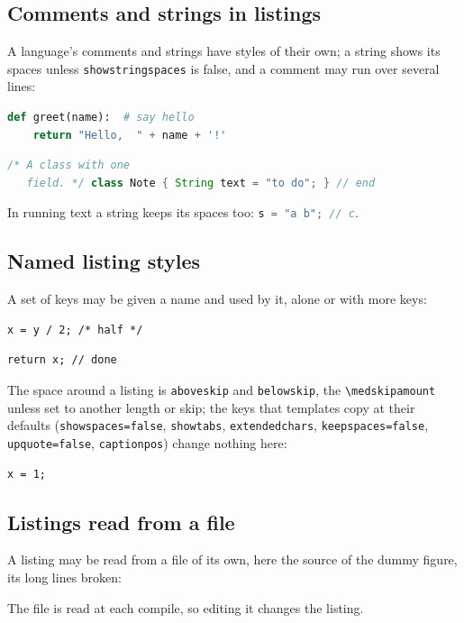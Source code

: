 \documentclass{article}
\numberwithin{equation}{section}
\theoremstyle{definition}
\theoremstyle{remark}
\begin{document}
\subsection{Comments and strings in listings}\label{sec:lstcomments}
A language's comments and strings have styles of their own; a string shows its spaces
unless \texttt{showstringspaces} is false, and a comment may run over several lines:
\begin{lstlisting}[language=Python,commentstyle=\color{rtdeep}\itshape,stringstyle=\color{rtblue}]
def greet(name):  # say hello
    return "Hello,  " + name + '!'
\end{lstlisting}
\begin{lstlisting}[language=Java,columns=fullflexible,showstringspaces=false,stringstyle=\color{rtblue}]
/* A class with one
   field. */ class Note { String text = "to do"; } // end
\end{lstlisting}
In running text a string keeps its spaces too: \lstinline[language=Java]|s = "a b"; // c|.

\subsection{Named listing styles}\label{sec:lststyles}
A set of keys may be given a name and used by it, alone or with more keys:
\begin{lstlisting}[style=rtcode]
x = y / 2; /* half */
\end{lstlisting}
\begin{lstlisting}[style=rtcode,frame=none,columns=fullflexible]
return x; // done
\end{lstlisting}
The space around a listing is \texttt{aboveskip} and \texttt{belowskip}, the
\verb|\medskipamount| unless set to another length or skip; the keys that templates copy at
their defaults (\texttt{showspaces=false}, \texttt{showtabs}, \texttt{extendedchars},
\texttt{keepspaces=false}, \texttt{upquote=false}, \texttt{captionpos}) change nothing here:
\begin{lstlisting}[aboveskip=\smallskipamount,belowskip=2pt,showspaces=false,showtabs=false,extendedchars=true,captionpos=b]
x = 1;
\end{lstlisting}

\subsection{Listings read from a file}\label{sec:lstinput}
A listing may be read from a file of its own, here the source of the dummy figure, its
long lines broken:

The file is read at each compile, so editing it changes the listing.
\end{document}
